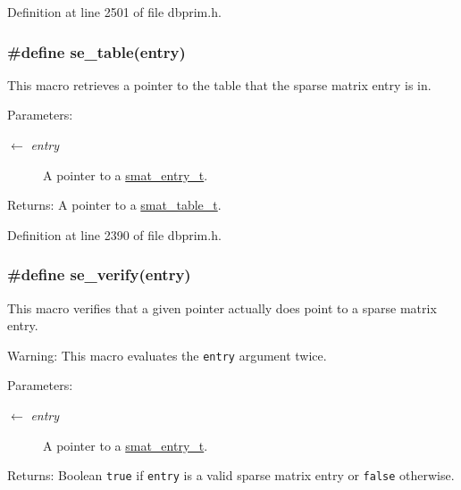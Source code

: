 Definition at line 2501 of file dbprim.h.\hypertarget{group__dbprim__smat_ga56}{
\subsubsection[se\_\-table]{\setlength{\rightskip}{0pt plus 5cm}\#define se\_\-table(entry)}}
\label{group__dbprim__smat_ga56}


This macro retrieves a pointer to the table that the sparse matrix entry is in.

\begin{Desc}
\item[Parameters:]
\begin{description}
\item[\mbox{$\leftarrow$} {\em entry}]A pointer to a \hyperlink{group__dbprim__smat_ga2}{smat\_\-entry\_\-t}.\end{description}
\end{Desc}
\begin{Desc}
\item[Returns:]A pointer to a \hyperlink{group__dbprim__smat_ga0}{smat\_\-table\_\-t}.\end{Desc}


Definition at line 2390 of file dbprim.h.\hypertarget{group__dbprim__smat_ga55}{
\subsubsection[se\_\-verify]{\setlength{\rightskip}{0pt plus 5cm}\#define se\_\-verify(entry)}}
\label{group__dbprim__smat_ga55}


This macro verifies that a given pointer actually does point to a sparse matrix entry.

\begin{Desc}
\item[Warning:]This macro evaluates the {\tt entry} argument twice.\end{Desc}
\begin{Desc}
\item[Parameters:]
\begin{description}
\item[\mbox{$\leftarrow$} {\em entry}]A pointer to a \hyperlink{group__dbprim__smat_ga2}{smat\_\-entry\_\-t}.\end{description}
\end{Desc}
\begin{Desc}
\item[Returns:]Boolean {\tt true} if {\tt entry} is a valid sparse matrix entry or {\tt false} otherwise.\end{Desc}


